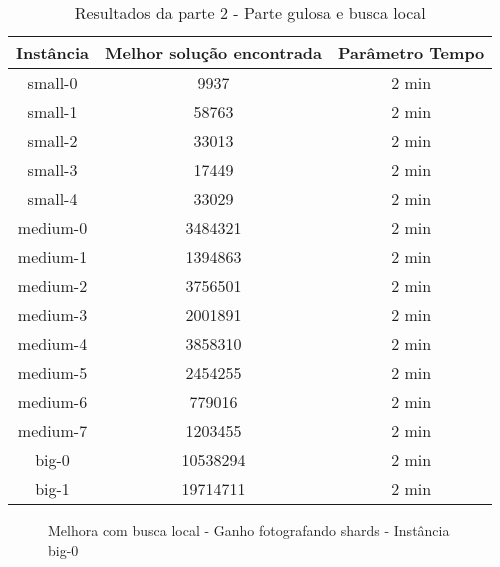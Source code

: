 \documentclass[11pt,letterpaper]{article}
\begin{document}
\begin{table}[h!]
  \begin{centering}
    \begin{tabular}{|c|c|c|}
      \hline 
      Instância & Melhor solução encontrada & Parâmetro Tempo  \tabularnewline
      \hline 
      \hline 
      small-0 & 9937 & 2 min  \tabularnewline %
      \hline 
      small-1 & 58763 & 2 min  \tabularnewline %
      \hline 
      small-2 & 33013 & 2 min  \tabularnewline %
      \hline 
      small-3 & 17449 & 2 min  \tabularnewline %
      \hline 
      small-4 & 33029 & 2 min  \tabularnewline %
      \hline 
      medium-0 &  3484321 & 2 min  \tabularnewline %
      \hline 
      medium-1 & 1394863 & 2 min  \tabularnewline %
      \hline 
      medium-2 & 3756501 & 2 min  \tabularnewline %
      \hline 
      medium-3 & 2001891 & 2 min  \tabularnewline %
      \hline 
      medium-4 & 3858310 & 2 min  \tabularnewline %
      \hline 
      medium-5 & 2454255 & 2 min  \tabularnewline %
      \hline 
      medium-6 & 779016 & 2 min  \tabularnewline %
      \hline 
      medium-7 & 1203455 & 2 min  \tabularnewline %
      \hline 
      big-0 & 10538294 & 2 min  \tabularnewline %
      \hline 
      big-1 & 19714711 & 2 min  \tabularnewline %
      \hline 

    \end{tabular}
    \par\end{centering}
  \caption{Resultados da parte 2 - Parte gulosa e busca local}
  \label{tab:loc}
\end{table}


\begin{figure}[h!]
  \begin{center}
  \end{center}
  \caption{Melhora com busca local - Ganho fotografando shards -
    Instância big-0}
  \label{graf:big}
\end{figure}
\end{document}
